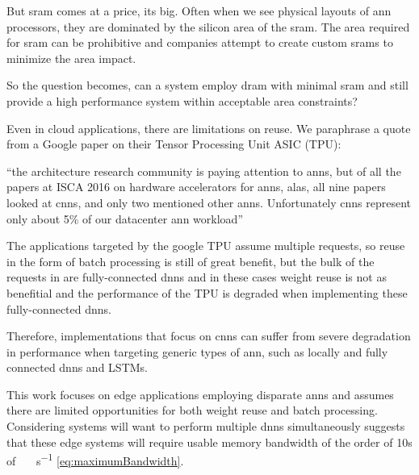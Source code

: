 But \ac{sram} comes at a price, its big. Often when we see physical layouts of \ac{ann} processors, they are dominated by the silicon area of the \ac{sram}. The area required for \ac{sram} can be prohibitive and companies attempt to create custom \acp{sram} to minimize the area impact.

So the question becomes, can a system employ \ac{dram} with minimal \ac{sram} and still provide a high performance system within acceptable area constraints?

\iffalse
We believe a system can be designed with \ac{dram} as the primary processing store. This will require careful use of data structures to describe storage within \ac{dram} to ensure we make good use of the potential bandwidth. But there are other benefits we will take advantage of, but more about that later.
\fi

\iffalse
There important application is disparate \ac{ann}s because specifically a form of \ac{dnn}, Convolutional Neural networks (\ac{cnn}) have gotten good press recently, but they are not the only \ac{dnn}.
\fi

Even in cloud applications, there are limitations on reuse. We paraphrase a quote from a Google paper \cite{tensorflow2015-whitepaper} on their Tensor Processing Unit ASIC (TPU):

\hyphenquote{american}{the architecture research community is paying attention to \acp{ann}, but of all the papers at ISCA 2016 on hardware accelerators for \acp{ann}, alas, all nine papers looked at \ac{cnn}s, and only two mentioned other \acp{ann}. Unfortunately \ac{cnn}s represent only about 5\% of our datacenter \ac{ann} workload}

The applications targeted by the google TPU \cite{tensorflow2015-whitepaper} assume multiple requests, so reuse in the form of batch processing is still of great benefit, but the bulk of the requests in \cite{tensorflow2015-whitepaper} are fully-connected \ac{dnn}s and in these cases weight reuse is not as benefitial and the performance of the TPU is degraded when implementing these fully-connected \ac{dnn}s.

Therefore, implementations that focus on \ac{cnn}s can suffer from severe degradation in performance when targeting generic types of \ac{ann}, such as locally and fully connected \ac{dnn}s and LSTMs.

This work focuses on edge applications employing disparate \ac{ann}s and assumes there are limited opportunities for both weight reuse and batch processing.
Considering systems will want to perform multiple \ac{dnn}s simultaneously suggests that these edge systems will require usable memory bandwidth of the order of 10s of \SI[per-mode=symbol]{}{\tera \bit \per \second} \eqref{eq:maximumBandwidth}.

